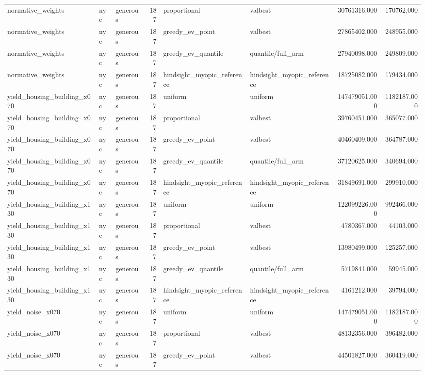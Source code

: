 \begin{tabular}{lllrllrr}
normative\_weights & nyc & generous & 187 & proportional & valbest & 30761316.000 & 170762.000 \\
normative\_weights & nyc & generous & 187 & greedy\_ev\_point & valbest & 27865402.000 & 248955.000 \\
normative\_weights & nyc & generous & 187 & greedy\_ev\_quantile & quantile/full\_arm & 27940098.000 & 249809.000 \\
normative\_weights & nyc & generous & 187 & hindsight\_myopic\_reference & hindsight\_myopic\_reference & 18725082.000 & 179434.000 \\
yield\_housing\_building\_x070 & nyc & generous & 187 & uniform & uniform & 147479051.000 & 1182187.000 \\
yield\_housing\_building\_x070 & nyc & generous & 187 & proportional & valbest & 39760451.000 & 365077.000 \\
yield\_housing\_building\_x070 & nyc & generous & 187 & greedy\_ev\_point & valbest & 40460409.000 & 364787.000 \\
yield\_housing\_building\_x070 & nyc & generous & 187 & greedy\_ev\_quantile & quantile/full\_arm & 37120625.000 & 340694.000 \\
yield\_housing\_building\_x070 & nyc & generous & 187 & hindsight\_myopic\_reference & hindsight\_myopic\_reference & 31849691.000 & 299910.000 \\
yield\_housing\_building\_x130 & nyc & generous & 187 & uniform & uniform & 122099226.000 & 992466.000 \\
yield\_housing\_building\_x130 & nyc & generous & 187 & proportional & valbest & 4780367.000 & 44103.000 \\
yield\_housing\_building\_x130 & nyc & generous & 187 & greedy\_ev\_point & valbest & 13980499.000 & 125257.000 \\
yield\_housing\_building\_x130 & nyc & generous & 187 & greedy\_ev\_quantile & quantile/full\_arm & 5719841.000 & 59945.000 \\
yield\_housing\_building\_x130 & nyc & generous & 187 & hindsight\_myopic\_reference & hindsight\_myopic\_reference & 4161212.000 & 39794.000 \\
yield\_noise\_x070 & nyc & generous & 187 & uniform & uniform & 147479051.000 & 1182187.000 \\
yield\_noise\_x070 & nyc & generous & 187 & proportional & valbest & 48132356.000 & 396482.000 \\
yield\_noise\_x070 & nyc & generous & 187 & greedy\_ev\_point & valbest & 44501827.000 & 360419.000 \\

\end{tabular}
